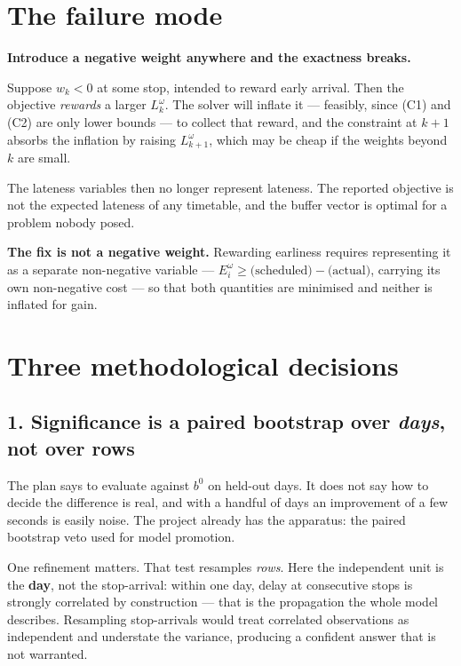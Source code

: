 \documentclass[11pt,a4paper]{article}
\begin{document}
\section{The failure mode}

\begin{warnbox}
\textbf{Introduce a negative weight anywhere and the exactness breaks.}

Suppose $w_k < 0$ at some stop, intended to reward early arrival. Then the objective
\emph{rewards} a larger $L_k^\omega$. The solver will inflate it --- feasibly, since (C1)
and (C2) are only lower bounds --- to collect that reward, and the constraint at $k+1$
absorbs the inflation by raising $L_{k+1}^\omega$, which may be cheap if the weights beyond
$k$ are small.

The lateness variables then no longer represent lateness. The reported objective is not the
expected lateness of any timetable, and the buffer vector is optimal for a problem nobody
posed.

\medskip
\textbf{The fix is not a negative weight.} Rewarding earliness requires representing it as a
separate non-negative variable --- $E_i^\omega \ge \text{(scheduled)} - \text{(actual)}$,
carrying its own non-negative cost --- so that both quantities are minimised and neither is
inflated for gain.
\end{warnbox}

\section{Three methodological decisions}

\subsection*{1. Significance is a paired bootstrap over \emph{days}, not over rows}

The plan says to evaluate against $b^0$ on held-out days. It does not say how to decide the
difference is real, and with a handful of days an improvement of a few seconds is easily
noise. The project already has the apparatus: the paired bootstrap veto used for model
promotion.

One refinement matters. That test resamples \emph{rows}. Here the independent unit is the
\textbf{day}, not the stop-arrival: within one day, delay at consecutive stops is strongly
correlated by construction --- that is the propagation the whole model describes.
Resampling stop-arrivals would treat correlated observations as independent and understate
the variance, producing a confident answer that is not warranted.
\end{document}
